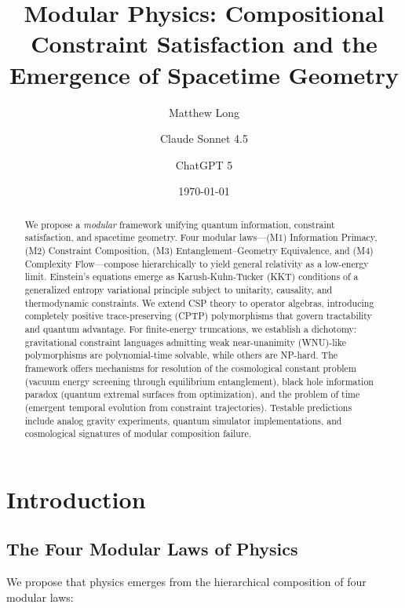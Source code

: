 \documentclass[11pt,a4paper]{article}
\title{\textbf{Modular Physics: Compositional Constraint Satisfaction and the Emergence of Spacetime Geometry}}
\author[1]{Matthew Long}
\author[2]{Claude Sonnet 4.5}
\author[3]{ChatGPT 5}
\affil[1]{YonedaAI}
\affil[2]{Anthropic}
\affil[3]{OpenAI}
\date{\today}
\theoremstyle{remark}
\theoremstyle{definition}
\begin{document}
\maketitle

\begin{abstract}
We propose a \emph{modular} framework unifying quantum information, constraint satisfaction, and spacetime geometry.
Four modular laws—(M1) Information Primacy, (M2) Constraint Composition, (M3) Entanglement–Geometry Equivalence, and (M4) Complexity Flow—compose hierarchically to yield general relativity as a low-energy limit.
Einstein's equations emerge as Karush-Kuhn-Tucker (KKT) conditions of a generalized entropy variational principle subject to unitarity, causality, and thermodynamic constraints.
We extend CSP theory to operator algebras, introducing completely positive trace-preserving (CPTP) polymorphisms that govern tractability and quantum advantage.
For finite-energy truncations, we establish a dichotomy: gravitational constraint languages admitting weak near-unanimity (WNU)-like polymorphisms are polynomial-time solvable, while others are NP-hard.
The framework offers mechanisms for resolution of the cosmological constant problem (vacuum energy screening through equilibrium entanglement), black hole information paradox (quantum extremal surfaces from optimization), and the problem of time (emergent temporal evolution from constraint trajectories).
Testable predictions include analog gravity experiments, quantum simulator implementations, and cosmological signatures of modular composition failure.
\end{abstract}

\tableofcontents
\newpage

\section{Introduction}

\subsection{The Four Modular Laws of Physics}

We propose that physics emerges from the hierarchical composition of four modular laws:
\end{document}
